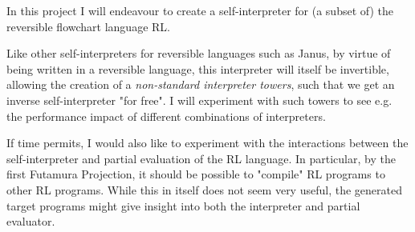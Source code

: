 \newcommand{\fakecite}{}

In this project I will endeavour to create a self-interpreter for (a subset of)
the reversible flowchart language RL{\fakecite}.

Like other self-interpreters for reversible languages such as Janus{\fakecite},
by virtue of being written in a reversible language, this interpreter will
itself be invertible, allowing the creation of a
\emph{non-standard interpreter towers}{\fakecite},
such that we get an inverse self-interpreter "for free".
I will experiment with such towers to see e.g. the performance impact of
different combinations of interpreters.

If time permits, I would also like to experiment with the interactions between
the self-interpreter and partial evaluation of the RL language{\fakecite}.
In particular, by the first Futamura Projection{\fakecite}, it should be
possible to "compile" RL programs to other RL programs. While this in itself
does not seem very useful, the generated target programs might give insight
into both the interpreter and partial evaluator.
